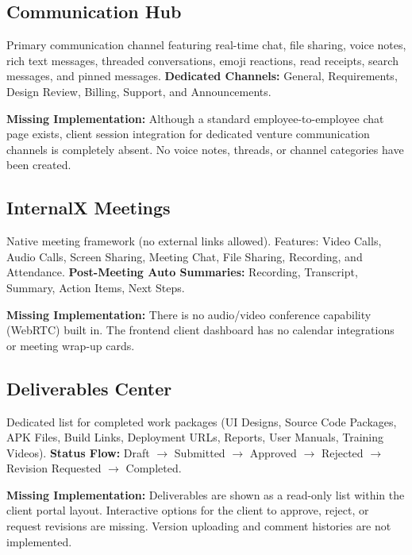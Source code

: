 \documentclass[11pt,a4paper]{article}
\begin{document}
\subsection{Communication Hub}
Primary communication channel featuring real-time chat, file sharing, voice notes, rich text messages, threaded conversations, emoji reactions, read receipts, search messages, and pinned messages.
\newline
\textbf{Dedicated Channels:} General, Requirements, Design Review, Billing, Support, and Announcements.
\begin{missingstatus}
  \textbf{Missing Implementation:} Although a standard employee-to-employee chat page exists, client session integration for dedicated venture communication channels is completely absent. No voice notes, threads, or channel categories have been created.
\end{missingstatus}

\subsection{InternalX Meetings}
Native meeting framework (no external links allowed). Features: Video Calls, Audio Calls, Screen Sharing, Meeting Chat, File Sharing, Recording, and Attendance.
\newline
\textbf{Post-Meeting Auto Summaries:} Recording, Transcript, Summary, Action Items, Next Steps.
\begin{missingstatus}
  \textbf{Missing Implementation:} There is no audio/video conference capability (WebRTC) built in. The frontend client dashboard has no calendar integrations or meeting wrap-up cards.
\end{missingstatus}

\subsection{Deliverables Center}
Dedicated list for completed work packages (UI Designs, Source Code Packages, APK Files, Build Links, Deployment URLs, Reports, User Manuals, Training Videos).
\newline
\textbf{Status Flow:} Draft $\rightarrow$ Submitted $\rightarrow$ Approved $\rightarrow$ Rejected $\rightarrow$ Revision Requested $\rightarrow$ Completed.
\begin{partialstatus}
  \textbf{Missing Implementation:} Deliverables are shown as a read-only list within the client portal layout. Interactive options for the client to approve, reject, or request revisions are missing. Version uploading and comment histories are not implemented.
\end{partialstatus}
\end{document}
